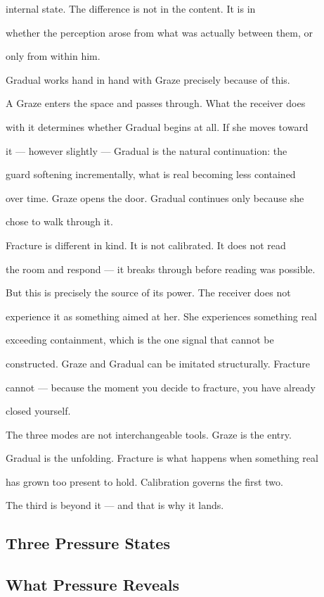 \documentclass[12pt, a4paper]{article}
\begin{document}
internal state. The difference is not in the content. It is in

whether the perception arose from what was actually between them, or

only from within him.

Gradual works hand in hand with Graze precisely because of this.

A Graze enters the space and passes through. What the receiver does

with it determines whether Gradual begins at all. If she moves toward

it --- however slightly --- Gradual is the natural continuation: the

guard softening incrementally, what is real becoming less contained

over time. Graze opens the door. Gradual continues only because she

chose to walk through it.

Fracture is different in kind. It is not calibrated. It does not read

the room and respond --- it breaks through before reading was possible.

But this is precisely the source of its power. The receiver does not

experience it as something aimed at her. She experiences something real

exceeding containment, which is the one signal that cannot be

constructed. Graze and Gradual can be imitated structurally. Fracture

cannot --- because the moment you decide to fracture, you have already

closed yourself.

The three modes are not interchangeable tools. Graze is the entry.

Gradual is the unfolding. Fracture is what happens when something real

has grown too present to hold. Calibration governs the first two.

The third is beyond it --- and that is why it lands.

\subsection{Three Pressure States}



\subsection{What Pressure Reveals}
\end{document}
